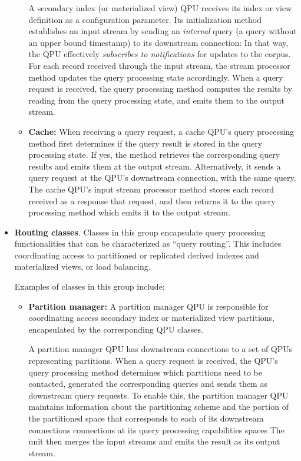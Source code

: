 \begin{itemize}
\begin{itemize}
    A secondary index (or materialized view) QPU receives its index or view definition as a configuration parameter.
    Its initialization method establishes an input stream by sending an \textit{interval} query
    (a query without an upper bound timestamp) to its downstream connection:
    In that way, the QPU effectively \textit{subscribes to notifications} for updates to the corpus.
    For each record received through the input stream, the stream processor method updates the query processing state accordingly.
    When a query request is received,
    the query processing method computes the results by reading from the query processing state,
    and emits them to the output stream.

    \item \textbf{Cache:}
    When receiving a query request, a cache QPU's query processing method first determines if the query result is stored
    in the query processing state.
    If yes, the method retrieves the corresponding query results and emits them at the output stream.
    Alternatively, it sends a query request at the QPU's downstream connection,
    with the same query.
    The cache QPU's input stream processor method stores each record received as a response that request,
    and then returns it to the query processing method which emits it to the output stream.
    \end{itemize}

  \item \textbf{Routing classes}.
  Classes in this group encapsulate query processing functionalities that can be characterized as ``query routing''.
  This includes coordinating access to partitioned or replicated derived indexes and materialized views,
  or load balancing.

  Examples of classes in this group include:
  \begin{itemize}
    \item \textbf{Partition manager:}
    A partition manager QPU is responsible for coordinating access secondary index or materialized view partitions,
    encapsulated by the corresponding QPU classes.

    A partition manager QPU has downstream connections to a set of QPUs representing partitions.
    When a query request is received, the QPU's query processing method determines which partitions need to be contacted,
    generated the corresponding queries and sends them as downstream query requests.
    To enable this, the partition manager QPU maintains information about the partitioning scheme and the portion of
    the partitioned space that corresponds to each of its downstream connections connections at its query processing
    capabilities spaces
    The unit then merges the input streams and emits the result as its output stream.


\end{itemize}
\end{itemize}
